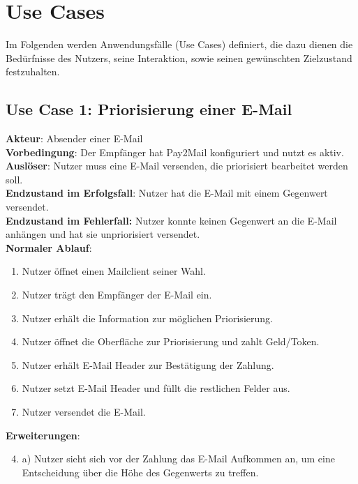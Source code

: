 
\section{Use Cases}
\label{Use_Cases}
Im Folgenden werden Anwendungsfälle (Use Cases) definiert, die dazu dienen die Bedürfnisse des Nutzers, seine Interaktion, sowie seinen gewünschten Zielzustand festzuhalten.

\subsection*{Use Case 1: Priorisierung einer E-Mail}
\textbf{Akteur}: Absender einer E-Mail \\
\textbf{Vorbedingung}: Der Empfänger hat Pay2Mail konfiguriert und nutzt es aktiv. \\
\textbf{Auslöser}: Nutzer muss eine E-Mail versenden, die priorisiert bearbeitet werden soll. \\
\textbf{Endzustand im Erfolgsfall}: Nutzer hat die E-Mail mit einem Gegenwert versendet. \\
\textbf{Endzustand im Fehlerfall:} Nutzer konnte keinen Gegenwert an die E-Mail anhängen und hat sie unpriorisiert versendet. \\

\noindent \textbf{Normaler Ablauf}:
\begin{enumerate}
    \item Nutzer öffnet einen Mailclient seiner Wahl.
    \item Nutzer trägt den Empfänger der E-Mail ein.
    \item Nutzer erhält die Information zur möglichen Priorisierung.
    \item Nutzer öffnet die Oberfläche zur Priorisierung und zahlt Geld/Token.
    \item Nutzer erhält E-Mail Header zur Bestätigung der Zahlung.
    \item Nutzer setzt E-Mail Header und füllt die restlichen Felder aus.
    \item Nutzer versendet die E-Mail.
\end{enumerate}

\noindent \textbf{Erweiterungen}:
\begin{enumerate}
\setcounter{enumi}{3}
    \item a) Nutzer sieht sich vor der Zahlung das E-Mail Aufkommen an, um eine Entscheidung über die Höhe des Gegenwerts zu treffen.
\end{enumerate}

